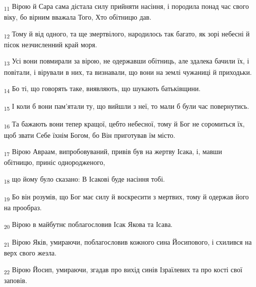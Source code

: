\begin{tcolorbox}
\textsubscript{11} Вірою й Сара сама дістала силу прийняти насіння, і породила понад час свого віку, бо вірним вважала Того, Хто обітницю дав.
\end{tcolorbox}
\begin{tcolorbox}
\textsubscript{12} Тому й від одного, та ще змертвілого, народилось так багато, як зорі небесні й пісок незчисленний край моря.
\end{tcolorbox}
\begin{tcolorbox}
\textsubscript{13} Усі вони повмирали за вірою, не одержавши обітниць, але здалека бачили їх, і повітали, і вірували в них, та визнавали, що вони на землі чужаниці й приходьки.
\end{tcolorbox}
\begin{tcolorbox}
\textsubscript{14} Бо ті, що говорять таке, виявляють, що шукають батьківщини.
\end{tcolorbox}
\begin{tcolorbox}
\textsubscript{15} І коли б вони пам'ятали ту, що вийшли з неї, то мали б були час повернутись.
\end{tcolorbox}
\begin{tcolorbox}
\textsubscript{16} Та бажають вони тепер кращої, цебто небесної, тому й Бог не соромиться їх, щоб звати Себе їхнім Богом, бо Він приготував їм місто.
\end{tcolorbox}
\begin{tcolorbox}
\textsubscript{17} Вірою Авраам, випробовуваний, привів був на жертву Ісака, і, мавши обітницю, приніс однородженого,
\end{tcolorbox}
\begin{tcolorbox}
\textsubscript{18} що йому було сказано: В Ісакові буде насіння тобі.
\end{tcolorbox}
\begin{tcolorbox}
\textsubscript{19} Бо він розумів, що Бог має силу й воскресити з мертвих, тому й одержав його на прообраз.
\end{tcolorbox}
\begin{tcolorbox}
\textsubscript{20} Вірою в майбутнє поблагословив Ісак Якова та Ісава.
\end{tcolorbox}
\begin{tcolorbox}
\textsubscript{21} Вірою Яків, умираючи, поблагословив кожного сина Йосипового, і схилився на верх свого жезла.
\end{tcolorbox}
\begin{tcolorbox}
\textsubscript{22} Вірою Йосип, умираючи, згадав про вихід синів Ізраїлевих та про кості свої заповів.
\end{tcolorbox}

